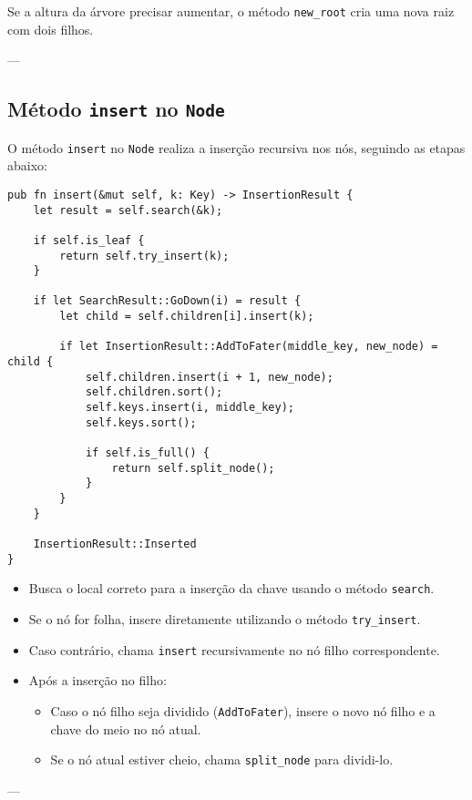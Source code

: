 Se a altura da árvore precisar aumentar, o método \texttt{new\_root} cria uma nova raiz com dois filhos.

---

\subsection{Método \texttt{insert} no \texttt{Node}}

O método \texttt{insert} no \texttt{Node} realiza a inserção recursiva nos nós, seguindo as etapas abaixo:

\begin{lstlisting}
pub fn insert(&mut self, k: Key) -> InsertionResult {
    let result = self.search(&k);

    if self.is_leaf {
        return self.try_insert(k);
    }

    if let SearchResult::GoDown(i) = result {
        let child = self.children[i].insert(k);

        if let InsertionResult::AddToFater(middle_key, new_node) = child {
            self.children.insert(i + 1, new_node);
            self.children.sort();
            self.keys.insert(i, middle_key);
            self.keys.sort();

            if self.is_full() {
                return self.split_node();
            }
        }
    }

    InsertionResult::Inserted
}
\end{lstlisting}

\begin{itemize}
    \item Busca o local correto para a inserção da chave usando o método \texttt{search}.
    \item Se o nó for folha, insere diretamente utilizando o método \texttt{try\_insert}.
    \item Caso contrário, chama \texttt{insert} recursivamente no nó filho correspondente.
    \item Após a inserção no filho:
    \begin{itemize}
        \item Caso o nó filho seja dividido (\texttt{AddToFater}), insere o novo nó filho e a chave do meio no nó atual.
        \item Se o nó atual estiver cheio, chama \texttt{split\_node} para dividi-lo.
    \end{itemize}
\end{itemize}

---

